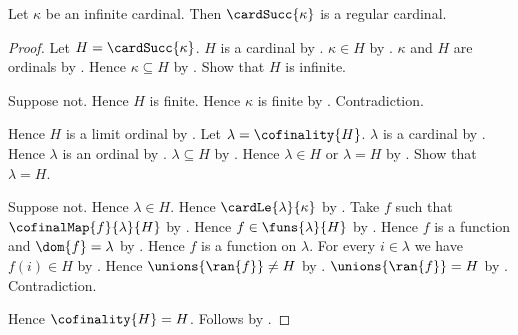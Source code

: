 \begin{theorem}\label{infinite_cardinal_successor_is_regular}
    Let $\kappa$ be an infinite cardinal.
    Then $\cardSucc{\kappa}$ is a regular cardinal.
\end{theorem}
\begin{proof}
    Let $H=\cardSucc{\kappa}$.
    $H$ is a cardinal by .
    $\kappa\in H$ by .
    $\kappa$ and $H$ are ordinals
        by .
    Hence $\kappa\subseteq H$ by .
    Show that $H$ is infinite.
    \begin{subproof}
        Suppose not.
        Hence $H$ is finite.
        Hence $\kappa$ is finite by .
        Contradiction.
    \end{subproof}
    Hence $H$ is a limit ordinal
        by .
    Let $\lambda=\cofinality{H}$.
    $\lambda$ is a cardinal by .
    Hence $\lambda$ is an ordinal by .
    $\lambda\subseteq H$ by .
    Hence $\lambda\in H$ or $\lambda=H$
        by .
    Show that $\lambda=H$.
    \begin{subproof}
        Suppose not.
        Hence $\lambda\in H$.
        Hence $\cardLe{\lambda}{\kappa}$
            by .
        Take $f$ such that $\cofinalMap{f}{\lambda}{H}$
            by .
        Hence $f\in\funs{\lambda}{H}$ by .
        Hence $f$ is a function and $\dom{f}=\lambda$
            by .
        Hence $f$ is a function on $\lambda$.
        For every $i\in\lambda$ we have $f(i)\in H$
            by .
        Hence $\unions{\ran{f}}\neq H$
            by .
        $\unions{\ran{f}}=H$
            by .
        Contradiction.
    \end{subproof}
    Hence $\cofinality{H}=H$.
    Follows by .
\end{proof}

